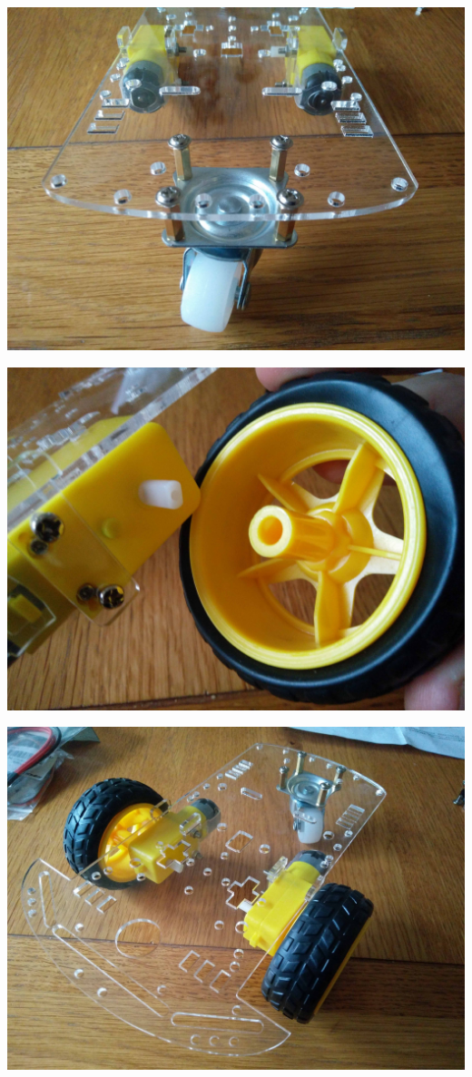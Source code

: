 \documentclass[]{bilingualworkshop}
\begin{document}
    \includegraphics[width=15cm]{img/10.jpg}\par
    \includegraphics[width=15cm]{img/11.jpg}\par
    \includegraphics[width=15cm]{img/12.jpg}

    
\end{document}

